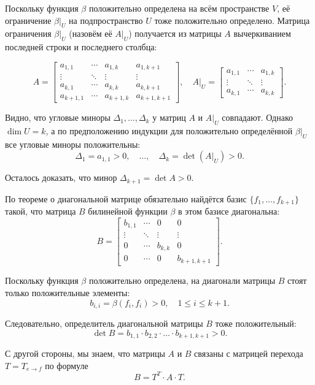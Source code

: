 \documentclass[12pt]{article}
\begin{document}
Поскольку функция $\beta$ положительно определена на всём пространстве $V$, её ограничение $\beta|_U$ на подпространство $U$ тоже положительно определено. Матрица ограничения $\beta|_U$ (назовём её $A|_U$) получается из матрицы $A$ вычеркиванием последней строки и последнего столбца:

\[
A =
\begin{bmatrix}
a_{1,1} & \cdots & a_{1,k} & a_{1,k+1} \\
\vdots & \ddots & \vdots & \vdots \\
a_{k,1} & \cdots & a_{k,k} & a_{k,k+1} \\
a_{k+1,1} & \cdots & a_{k+1,k} & a_{k+1,k+1}
\end{bmatrix}, \quad
A|_U =
\begin{bmatrix}
a_{1,1} & \cdots & a_{1,k} \\
\vdots & \ddots & \vdots \\
a_{k,1} & \cdots & a_{k,k}
\end{bmatrix}.
\]

Видно, что угловые миноры $\Delta_1, \dots, \Delta_k$ у матриц $A$ и $A|_U$ совпадают. Однако $\dim U = k$, а по предположению индукции для положительно определённой $\beta|_U$ все угловые миноры положительны:
\[
\Delta_1 = a_{1,1} > 0, \quad \dots, \quad \Delta_k = \det(A|_U) > 0.
\]

Осталось доказать, что минор $\Delta_{k+1} = \det A > 0$.

По теореме о диагональной матрице обязательно найдётся базис $\{f_1, \dots, f_{k+1}\}$ такой, что матрица $B$ билинейной функции $\beta$ в этом базисе диагональна:
\[
B =
\begin{bmatrix}
b_{1,1} & \cdots & 0 & 0 \\
\vdots & \ddots & \vdots & \vdots \\
0 & \cdots & b_{k,k} & 0 \\
0 & \cdots & 0 & b_{k+1,k+1}
\end{bmatrix}.
\]

Поскольку функция $\beta$ положительно определена, на диагонали матрицы $B$ стоят только положительные элементы:
\[
b_{i,i} = \beta(f_i, f_i) > 0, \quad 1 \leq i \leq k+1.
\]

Следовательно, определитель диагональной матрицы $B$ тоже положительный:
\[
\det B = b_{1,1} \cdot b_{2,2} \cdot \ldots \cdot b_{k+1,k+1} > 0.
\]

С другой стороны, мы знаем, что матрицы $A$ и $B$ связаны с матрицей перехода $T = T_{e \to f}$ по формуле
\[
B = T^T \cdot A \cdot T.
\]
\end{document}
